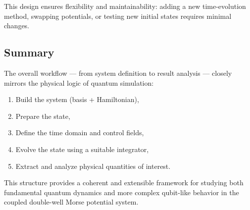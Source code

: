 \documentclass{subfiles}
\begin{document}
This design ensures flexibility and maintainability: adding a new time-evolution method, swapping potentials, or testing new initial states requires minimal changes.

\subsection*{Summary}

The overall workflow — from system definition to result analysis — closely mirrors the physical logic of quantum simulation:
\begin{enumerate}
    \item Build the system (basis + Hamiltonian),
    \item Prepare the state,
    \item Define the time domain and control fields,
    \item Evolve the state using a suitable integrator,
    \item Extract and analyze physical quantities of interest.
\end{enumerate}

This structure provides a coherent and extensible framework for studying both fundamental quantum dynamics and more complex qubit-like behavior in the coupled double-well Morse potential system.
\end{document}
